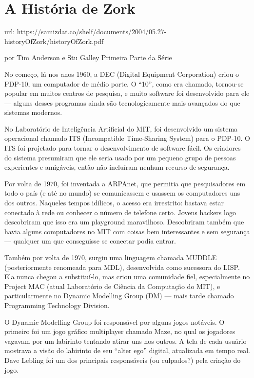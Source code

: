 \documentclass[12pt,a4paper]{article}
\begin{document}
\section{A História de Zork}

url: https://samizdat.co/shelf/documents/2004/05.27-historyOfZork/historyOfZork.pdf

por Tim Anderson e Stu Galley
Primeira Parte da Série

No começo, lá nos anos 1960, a DEC (Digital Equipment Corporation) criou o PDP-10, um computador de médio porte. O “10”, como era chamado, tornou-se popular em muitos centros de pesquisa, e muito software foi desenvolvido para ele — alguns desses programas ainda são tecnologicamente mais avançados do que sistemas modernos.

No Laboratório de Inteligência Artificial do MIT, foi desenvolvido um sistema operacional chamado ITS (Incompatible Time-Sharing System) para o PDP-10. O ITS foi projetado para tornar o desenvolvimento de software fácil. Os criadores do sistema presumiram que ele seria usado por um pequeno grupo de pessoas experientes e amigáveis, então não incluíram nenhum recurso de segurança.

Por volta de 1970, foi inventada a ARPAnet, que permitia que pesquisadores em todo o país (e até no mundo) se comunicassem e usassem os computadores uns dos outros. Naqueles tempos idílicos, o acesso era irrestrito: bastava estar conectado à rede ou conhecer o número de telefone certo. Jovens hackers logo descobriram que isso era um playground maravilhoso. Descobriram também que havia alguns computadores no MIT com coisas bem interessantes e sem segurança — qualquer um que conseguisse se conectar podia entrar.

Também por volta de 1970, surgiu uma linguagem chamada MUDDLE (posteriormente renomeada para MDL), desenvolvida como sucessora do LISP. Ela nunca chegou a substituí-lo, mas criou uma comunidade fiel, especialmente no Project MAC (atual Laboratório de Ciência da Computação do MIT), e particularmente no Dynamic Modelling Group (DM) — mais tarde chamado Programming Technology Division.

O Dynamic Modelling Group foi responsável por alguns jogos notáveis. O primeiro foi um jogo gráfico multiplayer chamado Maze, no qual os jogadores vagavam por um labirinto tentando atirar uns nos outros. A tela de cada usuário mostrava a visão do labirinto de seu “alter ego” digital, atualizada em tempo real. Dave Lebling foi um dos principais responsáveis (ou culpados?) pela criação do jogo.
\end{document}

